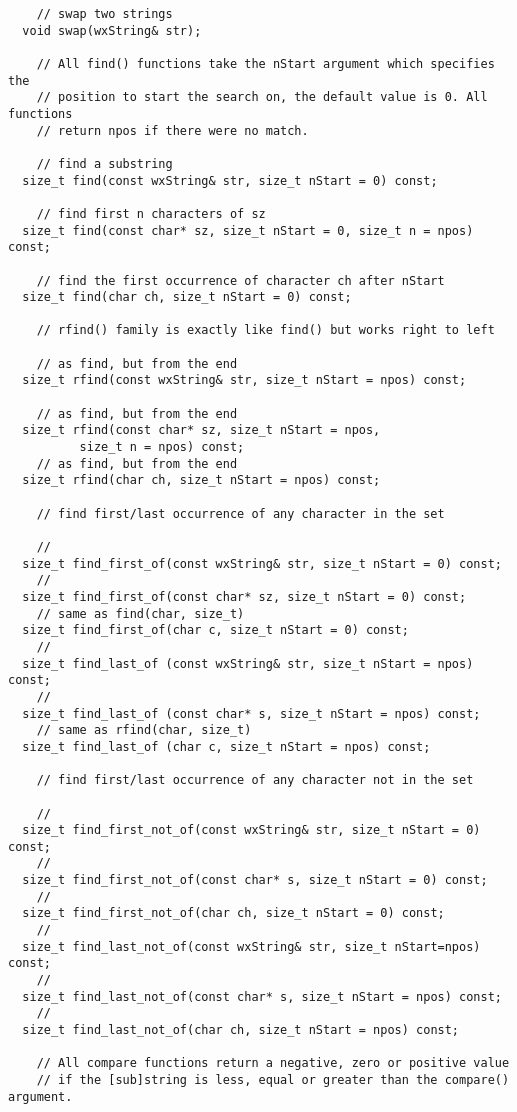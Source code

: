 \begin{verbatim}
    // swap two strings
  void swap(wxString& str);

    // All find() functions take the nStart argument which specifies the
    // position to start the search on, the default value is 0. All functions
    // return npos if there were no match.

    // find a substring
  size_t find(const wxString& str, size_t nStart = 0) const;

    // find first n characters of sz
  size_t find(const char* sz, size_t nStart = 0, size_t n = npos) const;

    // find the first occurrence of character ch after nStart
  size_t find(char ch, size_t nStart = 0) const;

    // rfind() family is exactly like find() but works right to left

    // as find, but from the end
  size_t rfind(const wxString& str, size_t nStart = npos) const;

    // as find, but from the end
  size_t rfind(const char* sz, size_t nStart = npos,
          size_t n = npos) const;
    // as find, but from the end
  size_t rfind(char ch, size_t nStart = npos) const;

    // find first/last occurrence of any character in the set

    //
  size_t find_first_of(const wxString& str, size_t nStart = 0) const;
    //
  size_t find_first_of(const char* sz, size_t nStart = 0) const;
    // same as find(char, size_t)
  size_t find_first_of(char c, size_t nStart = 0) const;
    //
  size_t find_last_of (const wxString& str, size_t nStart = npos) const;
    //
  size_t find_last_of (const char* s, size_t nStart = npos) const;
    // same as rfind(char, size_t)
  size_t find_last_of (char c, size_t nStart = npos) const;

    // find first/last occurrence of any character not in the set

    //
  size_t find_first_not_of(const wxString& str, size_t nStart = 0) const;
    //
  size_t find_first_not_of(const char* s, size_t nStart = 0) const;
    //
  size_t find_first_not_of(char ch, size_t nStart = 0) const;
    //
  size_t find_last_not_of(const wxString& str, size_t nStart=npos) const;
    //
  size_t find_last_not_of(const char* s, size_t nStart = npos) const;
    //
  size_t find_last_not_of(char ch, size_t nStart = npos) const;

    // All compare functions return a negative, zero or positive value
    // if the [sub]string is less, equal or greater than the compare() argument.


\end{verbatim}
